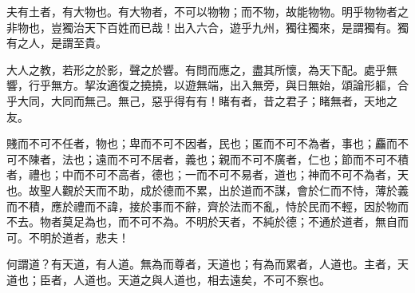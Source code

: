 \begin{pinyinscope}
夫有土者，有大物也。有大物者，不可以物物；而不物，故能物物。明乎物物者之非物也，豈獨治天下百姓而已哉！出入六合，遊乎九州，獨往獨來，是謂獨有。獨有之人，是謂至貴。

大人之教，若形之於影，聲之於響。有問而應之，盡其所懷，為天下配。處乎無響，行乎無方。挈汝適復之撓撓，以遊無端，出入無旁，與日無始，頌論形軀，合乎大同，大同而無己。無己，惡乎得有有！睹有者，昔之君子；睹無者，天地之友。

賤而不可不任者，物也；卑而不可不因者，民也；匿而不可不為者，事也；麤而不可不陳者，法也；遠而不可不居者，義也；親而不可不廣者，仁也；節而不可不積者，禮也；中而不可不高者，德也；一而不可不易者，道也；神而不可不為者，天也。故聖人觀於天而不助，成於德而不累，出於道而不謀，會於仁而不恃，薄於義而不積，應於禮而不諱，接於事而不辭，齊於法而不亂，恃於民而不輕，因於物而不去。物者莫足為也，而不可不為。不明於天者，不純於德；不通於道者，無自而可。不明於道者，悲夫！

何謂道？有天道，有人道。無為而尊者，天道也；有為而累者，人道也。主者，天道也；臣者，人道也。天道之與人道也，相去遠矣，不可不察也。


\end{pinyinscope}
